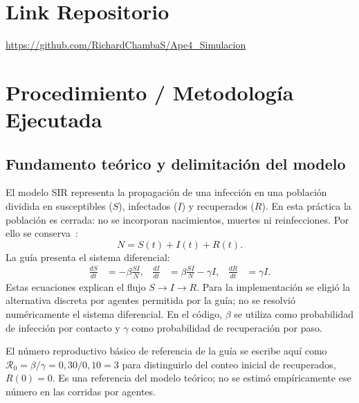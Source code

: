 \documentclass[11pt,a4paper]{article}
\begin{document}
\section{Link Repositorio}
\url{https://github.com/RichardChambaS/Ape4_Simulacion}

\newpage
\section{Procedimiento / Metodología Ejecutada}

\subsection{Fundamento teórico y delimitación del modelo}
El modelo SIR representa la propagación de una infección en una población dividida en susceptibles ($S$), infectados ($I$) y recuperados ($R$). En esta práctica la población es cerrada: no se incorporan nacimientos, muertes ni reinfecciones. Por ello se conserva~\cite{guia}:
\[
N=S(t)+I(t)+R(t).
\]
La guía presenta el sistema diferencial:
\begin{align*}
\frac{dS}{dt}&=-\beta\frac{SI}{N}, &
\frac{dI}{dt}&=\beta\frac{SI}{N}-\gamma I, &
\frac{dR}{dt}&=\gamma I.
\end{align*}
Estas ecuaciones explican el flujo $S\rightarrow I\rightarrow R$. Para la implementación se eligió la alternativa discreta por agentes permitida por la guía; no se resolvió numéricamente el sistema diferencial.
En el código, $\beta$ se utiliza como probabilidad de infección por contacto y $\gamma$ como probabilidad de recuperación por paso.

El número reproductivo básico de referencia de la guía se escribe aquí como
$\mathcal{R}_0=\beta/\gamma=0{,}30/0{,}10=3$ para distinguirlo del conteo inicial de recuperados, $R(0)=0$. Es una referencia del modelo teórico; no se estimó empíricamente ese número en las corridas por agentes.
\end{document}
